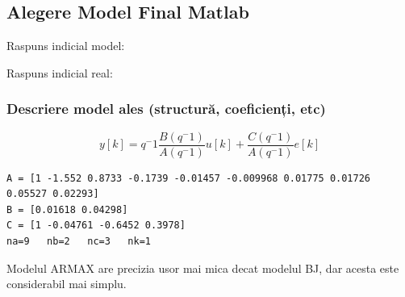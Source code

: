 \documentclass[12pt,english]{article}
\begin{document}
\subsection {Alegere Model Final Matlab }
Raspuns indicial model:
\begin{center}
\end{center}
Raspuns indicial real:
\begin{center}
\end{center}
\subsubsection {Descriere model ales (structură, coeficienți, etc) }
\[ y[k] = q^-1 \dfrac{B(q^-1)}{A(q^-1)}u[k] + \dfrac{C(q^-1)}{A(q^-1)}e[k] \]

\begin{lstlisting}
A = [1 -1.552 0.8733 -0.1739 -0.01457 -0.009968 0.01775 0.01726 0.05527 0.02293]
B = [0.01618 0.04298]
C = [1 -0.04761 -0.6452 0.3978]
na=9   nb=2   nc=3   nk=1
\end{lstlisting}
Modelul ARMAX are precizia usor mai mica decat modelul BJ, dar acesta este considerabil mai simplu.
\end{document}
